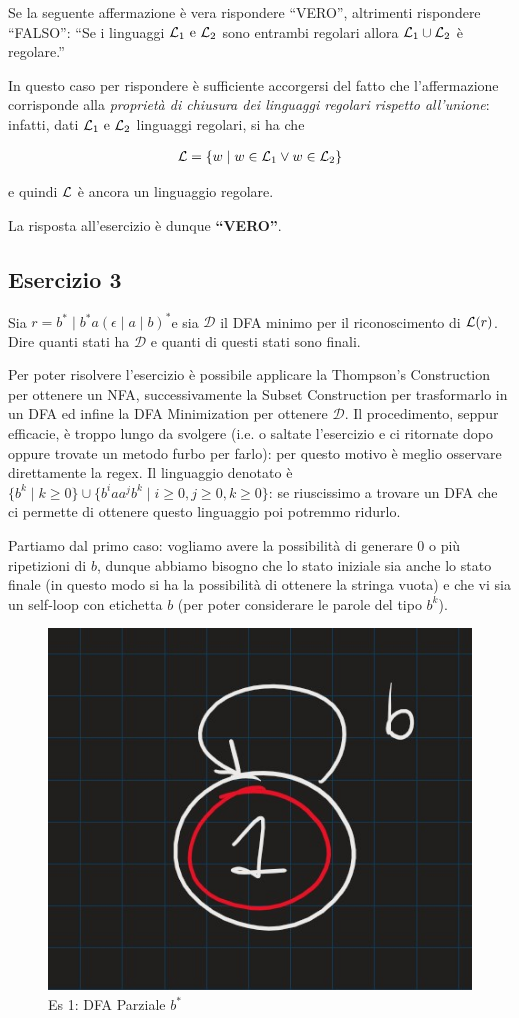 \documentclass[class=book, crop=false, oneside, 12pt]{standalone}
\begin{document}
Se la seguente affermazione è vera rispondere “VERO”, altrimenti rispondere “FALSO”: “Se i linguaggi \(\mathcal{L}_1 \textrm{ e } \mathcal{L}_2\) sono entrambi regolari allora \(\mathcal{L}_1 \cup \mathcal{L}_2\) è regolare.”

In questo caso per rispondere è sufficiente accorgersi del fatto che l'affermazione corrisponde alla \emph{proprietà di chiusura dei linguaggi regolari rispetto all'unione}: infatti, dati \(\mathcal{L}_1 \textrm{ e } \mathcal{L}_2\) linguaggi regolari, si ha che 

\begin{align*}
    \mathcal{L} = \{w \mid w \in \mathcal{L}_1 \lor w \in \mathcal{L}_2\}
\end{align*}

e quindi \(\mathcal{L}\) è ancora un linguaggio regolare. 

La risposta all'esercizio è dunque \textbf{“VERO”}.

\subsection{Esercizio 3}

Sia \(r=b^* \mid b^* a (\epsilon \mid a \mid b)^*\)e sia \(\mathcal{D}\) il DFA minimo per il riconoscimento di \(\mathcal{L}(r)\). Dire quanti stati ha \(\mathcal{D}\) e quanti di questi stati sono finali.

Per poter risolvere l'esercizio è possibile applicare la Thompson's Construction per ottenere un NFA, successivamente la Subset Construction per trasformarlo in un DFA ed infine la DFA Minimization per ottenere \(\mathcal{D}\). Il procedimento, seppur efficacie, è troppo lungo da svolgere (i.e. o saltate l'esercizio e ci ritornate dopo oppure trovate un metodo furbo per farlo): per questo motivo è meglio osservare direttamente la regex. Il linguaggio denotato è \(\{b^k \mid k \geq 0\} \cup \{b^i a a^j b^k \mid i \geq 0, j \geq 0, k \geq 0\}\): se riuscissimo a trovare un DFA che ci permette di ottenere questo linguaggio poi potremmo ridurlo. 

Partiamo dal primo caso: vogliamo avere la possibilità di generare 0 o più ripetizioni di \(b\), dunque abbiamo bisogno che lo stato iniziale sia anche lo stato finale (in questo modo si ha la possibilità di ottenere la stringa vuota) e che vi sia un self-loop con etichetta \(b\) (per poter considerare le parole del tipo \(b^k\)).

\begin{figure}[H]
	\centering
    \includegraphics[width=.3\textwidth]{dfa-pt1-ex3.jpg}
    \caption{Es 1: DFA Parziale \(b^*\)}
    \label{fig:dfa-pt1-ex3}
\end{figure}
\end{document}
